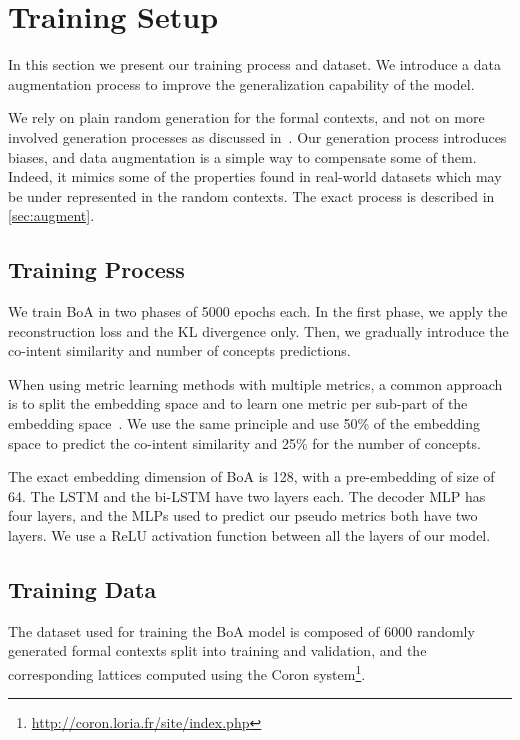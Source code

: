 \section{Training Setup}\label{seq:training}
In this section we present our training process and dataset.
We introduce a data augmentation process to improve the generalization capability of the model.

We rely on plain random generation for the formal contexts, and not on more involved generation processes as discussed in~\cite{random-closure:2011:ganter,random-context-dirichlet:2019:felde}.
Our generation process introduces biases, and data augmentation is a simple way to compensate some of them.
Indeed, it mimics some of the properties found in real-world datasets which may be under represented in the random contexts.
%
The exact process is described in \autoref{sec:augment}.

\subsection{Training Process}
We train BoA in two phases of 5000 epochs each.
In the first phase, we apply the reconstruction loss and the KL divergence only.
Then, we gradually introduce the co-intent similarity and number of concepts predictions.

When using metric learning methods with multiple metrics, a common approach is to split the embedding space and to learn one metric per sub-part of the embedding space~\cite{deep-metric-multispeaker:2020:kulkarni}.
We use the same principle and use 50\% of the embedding space to predict the co-intent similarity and 25\% for the number of concepts.

The exact embedding dimension of BoA is 128, with a pre-embedding of size of 64.
The LSTM and the bi-LSTM have two layers each.
The decoder MLP has four layers, and the MLPs used to predict our pseudo metrics both have two layers.
We use a ReLU activation function between all the layers of our model.


\subsection{Training Data}
The dataset used for training the BoA model is composed of 6000 randomly generated formal contexts split into training and validation, and the corresponding lattices computed using the Coron system\footnote{\url{http://coron.loria.fr/site/index.php}}.%


